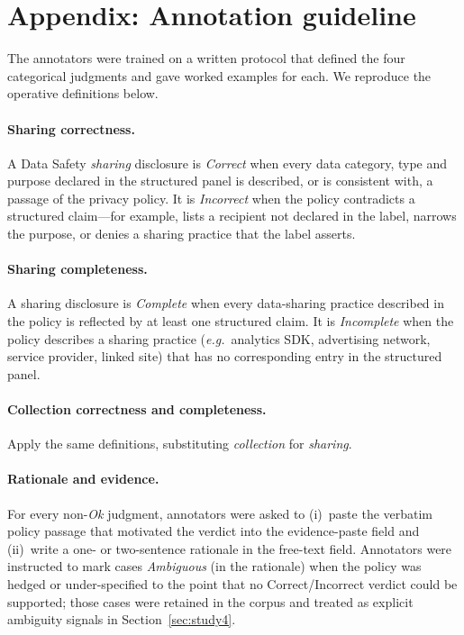 \documentclass[11pt,a4paper]{article}
\begin{document}


\appendix
\section{Appendix: Annotation guideline}
\label{app:guideline}
The annotators were trained on a written protocol that defined the
four categorical judgments and gave worked examples for each. We
reproduce the operative definitions below.

\paragraph{Sharing correctness.}
A Data Safety \emph{sharing} disclosure is \emph{Correct} when every
data category, type and purpose declared in the structured panel is
described, or is consistent with, a passage of the privacy policy.
It is \emph{Incorrect} when the policy contradicts a structured
claim---for example, lists a recipient not declared in the label,
narrows the purpose, or denies a sharing practice that the label
asserts.

\paragraph{Sharing completeness.}
A sharing disclosure is \emph{Complete} when every data-sharing
practice described in the policy is reflected by at least one
structured claim. It is \emph{Incomplete} when the policy describes a
sharing practice (\emph{e.g.}\ analytics SDK, advertising network,
service provider, linked site) that has no corresponding entry in the
structured panel.

\paragraph{Collection correctness and completeness.}
Apply the same definitions, substituting \emph{collection} for
\emph{sharing}.

\paragraph{Rationale and evidence.}
For every non-\emph{Ok} judgment, annotators were asked to (i)~paste
the verbatim policy passage that motivated the verdict into the
evidence-paste field and (ii)~write a one- or two-sentence rationale
in the free-text field. Annotators were instructed to mark cases
\emph{Ambiguous} (in the rationale) when the policy was hedged or
under-specified to the point that no Correct/Incorrect verdict could
be supported; those cases were retained in the corpus and treated as
explicit ambiguity signals in Section~\ref{sec:study4}.
\end{document}
